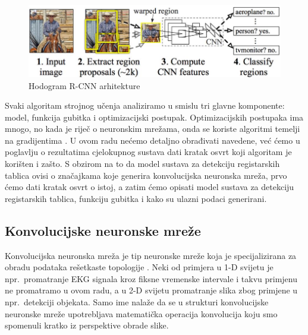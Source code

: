 \documentclass[times, utf8, diplomski]{fer}
\begin{document}
\begin{figure}[H]
    \centering
    \includegraphics[scale=0.5]{figures/detector/rcnn.jpg}
    \caption[Caption for LOF]{Hodogram R-CNN arhitekture\footnotemark}
    \label{fig:rcnn}
\end{figure}

Svaki algoritam strojnog učenja analiziramo u smislu tri glavne komponente: model, funkcija gubitka i optimizacijski postupak. Optimizacijskih postupaka ima mnogo, no kada je riječ o neuronskim mrežama, onda se koriste algoritmi temelji na gradijentima . U ovom radu nećemo detaljno obrađivati navedene, već ćemo u poglavlju o rezultatima cjelokupnog sustava dati kratak osvrt koji algoritam je korišten i zašto. S obzirom na to da model sustava za detekciju registarskih tablica ovisi o značajkama koje generira konvolucijska neuronska mreža, prvo ćemo dati kratak osvrt o istoj, a zatim ćemo opisati model sustava za detekciju registarskih tablica, funkciju gubitka i kako su ulazni podaci generirani.

\subsection{Konvolucijske neuronske mreže}
Konvolucijska neuronska mreža  je tip neuronske mreže koja je specijalizirana za obradu podataka rešetkaste  topologije \citep{Goodfellow-et-al-2016}. Neki od primjera u 1-D svijetu je npr.\ promatranje EKG signala kroz fiksne vremenske intervale i takvu primjenu ne promatramo u ovom radu, a u 2-D svijetu promatranje slika zbog primjene u npr.\ detekciji objekata. Samo ime nalaže da se u strukturi konvolucijske neuronske mreže upotrebljava matematička operacija konvolucija koju smo spomenuli kratko iz perspektive obrade slike.
\end{document}
